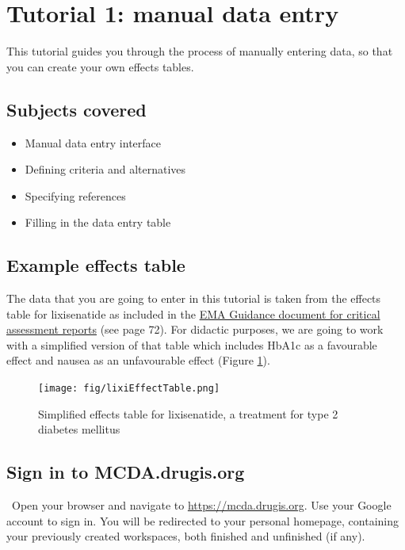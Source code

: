 \documentclass[00_mcda_tutorial.tex]{subfiles}
\begin{document}
\section*{Tutorial 1: manual data entry}
\addtocounter{section}{1}

This tutorial guides you through the process of manually entering data, so that you can create your own effects tables.

\subsection*{Subjects covered}
\begin{itemize}
    \item Manual data entry interface
    \item Defining criteria and alternatives
    \item Specifying references
    \item Filling in the data entry table
\end{itemize}

\subsection*{Example effects table}
The data that you are going to enter in this tutorial is taken from the effects table for lixisenatide as included in the \href{https://www.ema.europa.eu/documents/template-form/day-80-assessment-report-overview-d120-loq-template-guidance-rev-0718_en.doc}{EMA Guidance document for critical assessment reports} (see page 72).  For didactic purposes, we are going to work with a simplified version of that table which includes HbA1c as a favourable effect and nausea as an unfavourable effect (Figure \ref{fig:lixisenatide_effect_table}).

\begin{figure}[!h]
    \centering
    \texttt{[image: fig/lixiEffectTable.png]}
    \caption{Simplified effects table for lixisenatide, a treatment for type 2 diabetes mellitus}
    \label{fig:lixisenatide_effect_table}
\end{figure}

\subsection*{Sign in to MCDA.drugis.org}
\leftpointright \, Open your browser and navigate to \href{https://mcda.drugis.org}{https://mcda.drugis.org}. Use your Google account to sign in. You will be redirected to your personal homepage, containing your previously created workspaces, both finished and unfinished (if any).
\end{document}
